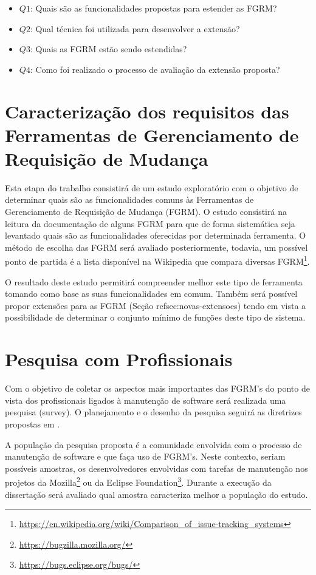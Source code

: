 \documentclass[msc,proposal,hidelot,hideabstract]{ppgccufmg} %
\begin{document}
\begin{itemize}
  \item \textbf{$Q1$}: Quais são as funcionalidades propostas para estender as FGRM?
  \item \textbf{$Q2$}: Qual técnica foi utilizada para desenvolver a extensão?
  \item \textbf{$Q3$}: Quais as FGRM estão sendo estendidas?
  \item \textbf{$Q4$}: Como foi realizado o processo de avaliação da extensão proposta?
\end{itemize}


\section{Caracterização dos requisitos das Ferramentas de Gerenciamento de Requisição de Mudança}
\label{sec:caracterizacao}

Esta etapa do trabalho consistirá de um estudo exploratório com o objetivo de determinar quais são as funcionalidades comuns às Ferramentas de Gerenciamento de Requisição de Mudança (FGRM). O estudo consistirá na leitura da documentação de alguns FGRM para que de forma sistemática seja levantado quais são as funcionalidades oferecidas por determinada ferramenta. O método de escolha das FGRM será avaliado posteriormente, todavia, um possível ponto de partida é a lista disponível na Wikipedia que compara diversas FGRM\footnote{\url{https://en.wikipedia.org/wiki/Comparison_of_issue-tracking_systems}}.

O resultado deste estudo permitirá compreender melhor este tipo de ferramenta tomando como base as suas funcionalidades em comum. Também será possível propor extensões para as FGRM (Seção ref{sec:novas-extensoes}) tendo em vista a possibilidade de determinar o conjunto mínimo de funções deste tipo de sistema. 

\section{Pesquisa com Profissionais}
\label{sec:survey}
Com o objetivo de coletar os aspectos mais importantes das FGRM's do ponto de
vista dos profissionais ligados à manutenção de software será realizada uma
 pesquisa (survey). O planejamento e o desenho da pesquisa seguirá as diretrizes propostas em \cite{wohlin2012experimentation}.

A população da pesquisa proposta é a comunidade envolvida com o processo de
manutenção de software e que faça uso de FGRM's. Neste contexto, seriam
possíveis amostras, os desenvolvedores envolvidas com tarefas de manutenção nos
projetos da Mozilla\footnote{\url{https://bugzilla.mozilla.org/}} ou da
Eclipse Foundation\footnote{\url{https://bugs.eclipse.org/bugs/}}. Durante a
execução da dissertação será avaliado qual amostra caracteriza melhor a
população do estudo.
\end{document}
